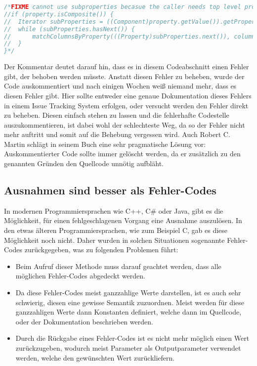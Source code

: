 \begin{lstlisting}[language=Java, caption=Beispiel für auskommentierten Code, label=lst:CommentedCode]
/*FIXME cannot use subproperties becasue the caller needs top level properties
//if (property.isComposite()) {
//	Iterator subProperties = ((Component)property.getValue()).getPropertyIterator();
// 	while (subProperties.hasNext()) {
//  	matchColumnsByProperty(((Property)subProperties.next()), columnsToProperty);
// 	}
}*/ 
\end{lstlisting}

\SuperPar Der Kommentar deutet darauf hin, dass es in diesem Codeabschnitt einen Fehler gibt, der behoben werden müsste. Anstatt diesen Fehler zu beheben, wurde der Code auskommentiert und nach einigen Wochen weiß niemand mehr, dass es diesen Fehler gibt. Hier sollte entweder eine genaue Dokumentation dieses Fehlers in einem Issue Tracking System erfolgen, oder versucht werden den Fehler direkt zu beheben. Diesen einfach stehen zu lassen und die fehlerhafte Codestelle auszukommentieren, ist dabei wohl der schlechteste Weg, da so der Fehler nicht mehr auftritt und somit auf die Behebung vergessen wird. Auch Robert C. Martin schlägt in seinem Buch eine sehr pragmatische Lösung vor: Auskommentierter Code sollte immer gelöscht werden, da er zusätzlich zu den genannten Gründen den Quellcode unnötig aufbläht.

\subsection{Ausnahmen sind besser als Fehler-Codes}
In modernen Programmiersprachen wie C++, C\# oder Java, gibt es die Möglichkeit, für einen fehlgeschlagenen Vorgang eine Ausnahme auszulösen. In den etwas älteren Programmiersprachen, wie zum Beispiel C, gab es diese Möglichkeit noch nicht. Daher wurden in solchen Situationen sogenannte Fehler-Codes zurückgegeben, was zu folgenden Problemen führt:

\begin{itemize}
	\item Beim Aufruf dieser Methode muss darauf geachtet werden, dass alle möglichen Fehler-Codes abgedeckt werden. 
	\item Da diese Fehler-Codes meist ganzzahlige Werte darstellen, ist es auch sehr schwierig, diesen eine gewisse Semantik zuzuordnen. Meist werden für diese ganzzahligen Werte dann Konstanten definiert, welche dann im Quellcode, oder der Dokumentation beschrieben werden. 
	\item Durch die Rückgabe eines Fehler-Codes ist es nicht mehr möglich einen Wert zurückzugeben, wodurch meist Parameter als Outputparameter verwendet werden, welche den gewünschten Wert zurückliefern.
\end{itemize}


